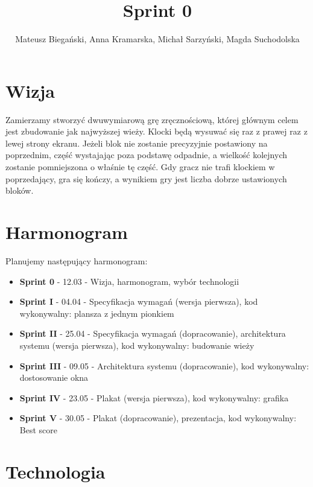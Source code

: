 \documentclass{article}
\begin{document}
\title{Sprint 0}

\author{Mateusz Biegański, Anna Kramarska, Michał Sarzyński, Magda Suchodolska}
\maketitle

\section{Wizja}

Zamierzamy stworzyć dwuwymiarową grę zręcznościową, której głównym celem jest zbudowanie jak najwyższej wieży.
Klocki będą wysuwać się raz z prawej raz z lewej strony ekranu.
Jeżeli blok nie zostanie precyzyjnie postawiony na poprzednim, część wystajając poza podstawę odpadnie, a wielkość kolejnych zostanie pomniejszona o właśnie tę część.
Gdy gracz nie trafi klockiem w poprzedający, gra się kończy, a wynikiem gry jest liczba dobrze ustawionych bloków.

\section{Harmonogram}
Planujemy następujący harmonogram:
\begin{itemize}
\item\textbf{Sprint 0} - 12.03 - Wizja, harmonogram, wybór technologii
\item\textbf{Sprint I} - 04.04 - Specyfikacja wymagań (wersja pierwsza), kod wykonywalny: plansza z jednym pionkiem
\item\textbf{Sprint II} - 25.04 - Specyfikacja wymagań (dopracowanie), architektura systemu (wersja pierwsza), kod wykonywalny: budowanie wieży
\item\textbf{Sprint III} - 09.05 - Architektura systemu (dopracowanie), kod wykonywalny: dostosowanie okna
\item\textbf{Sprint IV} - 23.05 - Plakat (wersja pierwsza), kod wykonywalny: grafika
\item\textbf{Sprint V} - 30.05 - Plakat (dopracowanie), prezentacja, kod wykonywalny: Best score
\end{itemize}
\section{Technologia}
\end{document}
